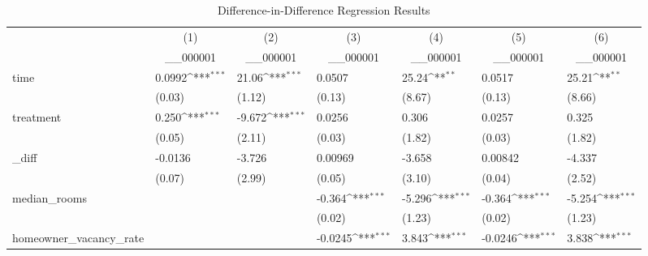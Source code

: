 \begingroup
    {
    \small
    \def\sym#1{\ifmmode^{#1}\else\(^{#1}\)\fi}
    \centering
    \begin{longtable}{|l|ll|ll|ll|}
    \caption{Difference-in-Difference Regression Results}
    \label{dd_res}
            \hline\hline
                        &\multicolumn{1}{c}{(1)}&\multicolumn{1}{c}{(2)}&\multicolumn{1}{c}{(3)}&\multicolumn{1}{c}{(4)}&\multicolumn{1}{c}{(5)}&\multicolumn{1}{c}{(6)}\\
                        &\multicolumn{1}{c}{\_\_000001}&\multicolumn{1}{c}{\_\_000001}&\multicolumn{1}{c}{\_\_000001}&\multicolumn{1}{c}{\_\_000001}&\multicolumn{1}{c}{\_\_000001}&\multicolumn{1}{c}{\_\_000001}\\
            \hline
            time        &      0.0992\sym{***}&       21.06\sym{***}&      0.0507         &       25.24\sym{**} &      0.0517         &       25.21\sym{**} \\
                        &      (0.03)         &      (1.12)         &      (0.13)         &      (8.67)         &      (0.13)         &      (8.66)         \\
            [1em]
            treatment   &       0.250\sym{***}&      -9.672\sym{***}&      0.0256         &       0.306         &      0.0257         &       0.325         \\
                        &      (0.05)         &      (2.11)         &      (0.03)         &      (1.82)         &      (0.03)         &      (1.82)         \\
            [1em]
            \_diff       &     -0.0136         &      -3.726         &     0.00969         &      -3.658         &     0.00842         &      -4.337         \\
                        &      (0.07)         &      (2.99)         &      (0.05)         &      (3.10)         &      (0.04)         &      (2.52)         \\
            [1em]
            median\_rooms&                     &                     &      -0.364\sym{***}&      -5.296\sym{***}&      -0.364\sym{***}&      -5.254\sym{***}\\
                        &                     &                     &      (0.02)         &      (1.23)         &      (0.02)         &      (1.23)         \\
            [1em]
            homeowner\_vacancy\_rate&                     &                     &     -0.0245\sym{***}&       3.843\sym{***}&     -0.0246\sym{***}&       3.838\sym{***}\\

\end{longtable}}
